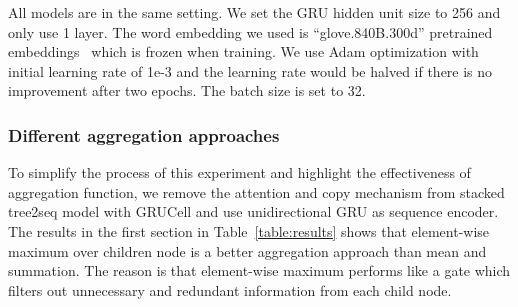 All models are in the same setting. We set the GRU hidden unit size to 256 and only use 1 layer. The word embedding we used is ``glove.840B.300d'' pretrained embeddings~\cite{pennington2014glove} which is frozen when training. We use Adam optimization with initial learning rate of 1e-3 and the learning rate would be halved if there is no improvement after two epochs. The batch size is set to 32.

\subsubsection*{Different aggregation approaches}
To simplify the process of this experiment and highlight the effectiveness of aggregation function, we remove the attention and copy mechanism from stacked tree2seq model with GRUCell and use unidirectional GRU as sequence encoder. The results in the first section in Table~\ref{table:results} shows that element-wise maximum over children node is a better aggregation approach than mean and summation. The reason is that element-wise maximum performs like a gate which filters out unnecessary and redundant information from each child node. 

